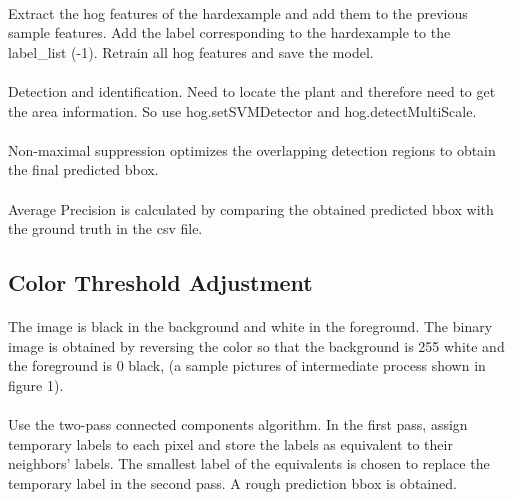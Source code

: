 \documentclass[conference]{IEEEtran}
\begin{document}
\paragraph{}Extract the hog features of the hardexample and add them to the previous sample features. Add the label corresponding to the hardexample to the label\_list (-1). Retrain all hog features and save the model.
\paragraph{}Detection and identification. Need to locate the plant and therefore need to get the area information. So use hog.setSVMDetector and hog.detectMultiScale.
\paragraph{}Non-maximal suppression optimizes the overlapping detection regions to obtain the final predicted bbox.
\paragraph{}Average Precision is calculated by comparing the obtained predicted bbox with the ground truth in the csv file.

\subsection{Color Threshold Adjustment}
\paragraph{}The image is black in the background and white in the foreground. The binary image is obtained by reversing the color so that the background is 255 white and the foreground is 0 black, (a sample pictures of intermediate process shown in figure 1).
\paragraph{}Use the two-pass connected components algorithm. In the first pass, assign temporary labels to each pixel and store the labels as equivalent to their neighbors' labels. The smallest label of the equivalents is chosen to replace the temporary label in the second pass. A rough prediction bbox is obtained.
\end{document}
